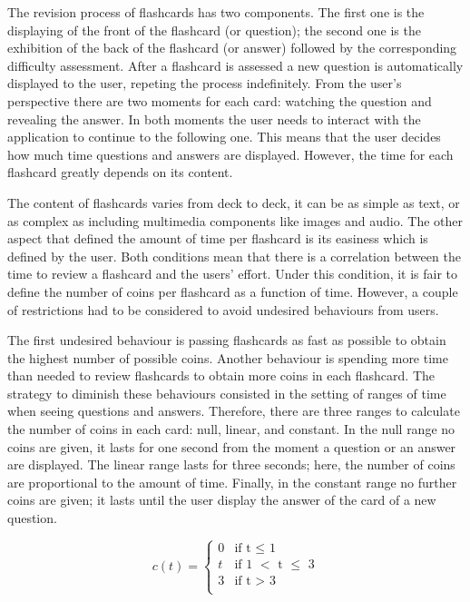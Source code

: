 The revision process of flashcards has two components. The first one is the displaying of the front of the flashcard (or question); the second one is the exhibition of the back of the flashcard (or answer) followed by the corresponding difficulty assessment. After a flashcard is assessed a new question is automatically displayed to the user, repeting the process indefinitely. From the user's perspective there are two moments for each card: watching the question and revealing the answer. In both moments the user needs to interact with the application to continue to the following one. This means that the user decides how much time questions and answers are displayed. However, the time for each flashcard greatly depends on its content.

The content of flashcards varies from deck to deck, it can be as simple as text, or as complex as including multimedia components like images and audio. The other aspect that defined the amount of time per flashcard is its easiness which is defined by the user. Both conditions mean that there is a correlation between the time to review a flashcard and the users' effort. Under this condition, it is fair to define the number of coins per flashcard as a function of time. However, a couple of restrictions had to be considered to avoid undesired behaviours from users.

The first undesired behaviour is passing flashcards as fast as possible to obtain the highest number of possible coins. Another behaviour is spending more time than needed to review flashcards to obtain more coins in each flashcard. The strategy to diminish these behaviours consisted in the setting of ranges of time when seeing questions and answers. Therefore, there are three ranges to calculate the number of coins in each card: null, linear, and constant. In the null range no coins are given, it lasts for one second from the moment a question or an answer are displayed. The linear range lasts for three seconds; here, the number of coins are proportional to the amount of time. Finally, in the constant range no further coins are given; it lasts until the user display the answer of the card of a new question.

\begin{equation}
	c(t) =
  		\begin{cases}
  			0 & \text{if t $\leq$ 1}\\
  			t & \text{if 1 $<$ t $\leq$ 3}\\
  			3 & \text{if t $>$ 3}\\
  		\end{cases}
  	\label{eq:coins-formula}
\end{equation}

